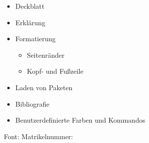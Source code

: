 \documentclass{scrartcl}
\begin{document}
    \begin{itemize}
        \item Deckblatt
        \item Erklärung
        \item Formatierung
        \begin{itemize}
            \item Seitenränder
            \item Kopf- und Fußzeile
        \end{itemize}
        \item Laden von Paketen
        \item Bibliografie
        \item Benutzerdefinierte Farben und Kommandos
    \end{itemize}

Font: \testfont
Matrikelnummer: \testmatrikel
\end{document}
